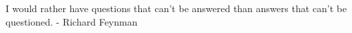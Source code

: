 \thispagestyle{empty}
\begin{center}
  \par\vfill\normalfont
  \renewcommand{\baselinestretch}{2.00}
  \sffamily
  I would rather have questions that can't be answered than answers that can't be questioned. - Richard Feynman
\end{center}
\newpage